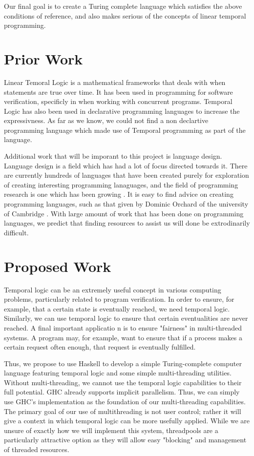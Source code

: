 \documentclass[numbers]{sigplanconf}
\begin{document}
Our final goal is to create a Turing complete language which satisfies
the above conditions of reference, and also makes serious of the
concepts of linear temporal programming.

\section{Prior Work}
 

Linear Temoral Logic is a mathematical frameworks that deals with when
statements are true over time. It has been used in programming for
software verification, specificly in when working with concurrent
programs\cite{AutomaticVerification, SimpleVerification}. Temporal
Logic has also been used in declarative programming languages to
increase the expressivness\cite{DeclarativeTemporal}. As far as we
know, we could not find a non declartive programming language which
made use of Temporal programming as part of the language. 

Additional work that will be imporant to this project is language design.
Language design is a field which has had a lot of focus directed
towards it. There are currently hundreds of languages that
have been created purely for exploration of creating interesting
programming lanaguages, and the field of programming research is one
which has been growing \cite{esolang}. It is easy to find advice on
creating programming languages, such as that given by Dominic Orchard
of the university of Cambridge \cite{4Rs}.  With large amount of work
that has been done on programming languages, we predict that finding
resources to assist us will done be extrodinarily difficult.

\section{Proposed Work}
Temporal logic can be an extremely useful concept in various 
computing problems, particularly related to program verification. 
In order to ensure, for example, that a certain state is eventually
reached,
 we need temporal logic. Similarly, we can use temporal logic to
 ensure
 that certain eventualities are never reached. A final important
 applicatio
n is to ensure "fairness" in multi-threaded systems. A program may, 
for example, want to ensure that if a process makes a certain request 
often enough, that request is eventually fulfilled.

Thus, we propose to use Haskell to develop a simple Turing-complete
 computer language featuring temporal logic and some simple
 multi-threading
 utilities. Without multi-threading, we cannot use the temporal logic 
capabilities to their full potential. GHC already supports implicit
parallelism.
 Thus, we can simply use GHC's implementation as the foundation
 of our multi-threading capabilities.
 The primary goal of our use of multithreading is not user control;
 rather it will give a context in which temporal logic can be more
 usefully applied. While we are unsure of exactly how we will
 implement this system, threadpools are a particularly attractive
 option as they will allow easy "blocking" and management of 
 threaded resources.
\end{document}
